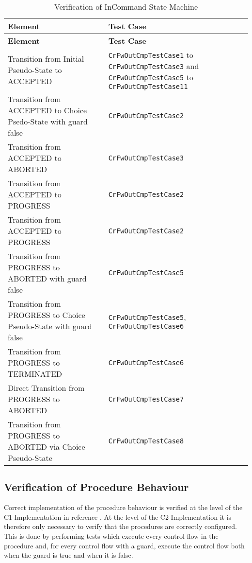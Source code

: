 \documentclass{pnp_article}
\begin{document}
\begin{longtable}{|>{\raggedright}p{8.0cm}|P{5.0cm}|}
\caption{Verification of InCommand State Machine}
\label{tab:verInCmdSM}\\
\hline
{}
\textbf{Element} & \textbf{Test Case} \\
\hline
\endfirsthead
{}
\textbf{Element} & \textbf{Test Case} \\
\hline
\endhead
Transition from Initial Pseudo-State to ACCEPTED  & \texttt{CrFwOutCmpTestCase1} to \texttt{CrFwOutCmpTestCase3} and \texttt{CrFwOutCmpTestCase5} to \texttt{CrFwOutCmpTestCase11} \\
\hline
Transition from ACCEPTED to Choice Psedo-State with guard false & \texttt{CrFwOutCmpTestCase2}\\
\hline
Transition from ACCEPTED to ABORTED & \texttt{CrFwOutCmpTestCase3}\\
\hline
Transition from ACCEPTED to PROGRESS & \texttt{CrFwOutCmpTestCase2}\\
\hline
Transition from ACCEPTED to PROGRESS & \texttt{CrFwOutCmpTestCase2}\\
\hline
Transition from PROGRESS to ABORTED with guard false & \texttt{CrFwOutCmpTestCase5}\\
\hline
Transition from PROGRESS to Choice Pseudo-State with guard false & \texttt{CrFwOutCmpTestCase5}, \texttt{CrFwOutCmpTestCase6}\\
\hline
Transition from PROGRESS to TERMINATED & \texttt{CrFwOutCmpTestCase6}\\
\hline
Direct Transition from PROGRESS to ABORTED & \texttt{CrFwOutCmpTestCase7}\\
\hline
Transition from PROGRESS to ABORTED via Choice Pseudo-State & \texttt{CrFwOutCmpTestCase8}\\
\hline
\end{longtable}

\subsection{Verification of Procedure Behaviour}
Correct implementation of the procedure behaviour is verified at the level of the C1 Implementation in reference \cite{ref:C1UserReq}. At the level of the C2 Implementation it is therefore only necessary to verify that the procedures are correctly configured. This is done by performing tests which execute every control flow in the procedure and, for every control flow with a guard, execute the control flow both when the guard is true and when it is false.
\end{document}
